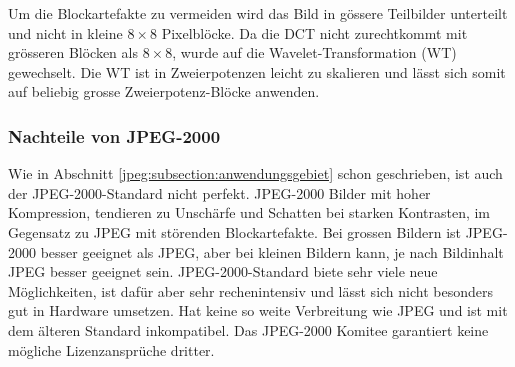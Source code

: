 Um die Blockartefakte zu vermeiden wird das Bild in gössere Teilbilder unterteilt und nicht in kleine \(8\times8\) Pixelblöcke.
Da die DCT nicht zurechtkommt mit grösseren Blöcken als \(8\times8\), wurde auf die Wavelet-Transformation (WT) gewechselt.
Die WT ist in Zweierpotenzen leicht zu skalieren und lässt sich somit auf beliebig grosse Zweierpotenz-Blöcke anwenden.

\subsubsection{Nachteile von JPEG-2000
\label{jpeg:subsubsection:nachteil}}
Wie in Abschnitt \ref{jpeg:subsection:anwendungsgebiet} schon geschrieben, ist auch der JPEG-2000-Standard nicht perfekt.
JPEG-2000 Bilder mit hoher Kompression, tendieren zu Unschärfe und Schatten bei starken Kontrasten, im Gegensatz zu JPEG mit störenden Blockartefakte.
Bei grossen Bildern ist JPEG-2000 besser geeignet als JPEG, aber bei kleinen Bildern kann, je nach Bildinhalt JPEG besser geeignet sein. 
JPEG-2000-Standard biete sehr viele neue Möglichkeiten, ist dafür aber sehr rechenintensiv und lässt sich nicht besonders gut in Hardware umsetzen.
Hat keine so weite Verbreitung wie JPEG und ist mit dem älteren Standard inkompatibel.
Das JPEG-2000 Komitee garantiert keine mögliche Lizenzansprüche dritter.
